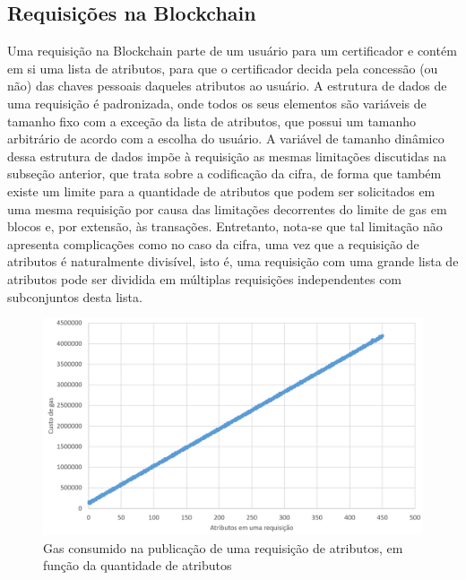 \documentclass[a4paper,11pt]{article}
\begin{document}
\subsection{Requisições na Blockchain}
\label{sec:sub:experimento-requisicoes}

Uma requisição na Blockchain parte de um usuário para um certificador e contém em si uma lista de atributos, para que o certificador decida pela concessão (ou não) das chaves pessoais daqueles atributos ao usuário.
A estrutura de dados de uma requisição é padronizada, onde todos os seus elementos são variáveis de tamanho fixo com a exceção da lista de atributos, que possui um tamanho arbitrário de acordo com a escolha do usuário.
A variável de tamanho dinâmico dessa estrutura de dados impõe à requisição as mesmas limitações discutidas na subseção anterior, que trata sobre a codificação da cifra, de forma que também existe um limite para a quantidade de atributos que podem ser solicitados em uma mesma requisição por causa das limitações decorrentes do limite de gas em blocos e, por extensão, às transações.
Entretanto, nota-se que tal limitação não apresenta complicações como no caso da cifra, uma vez que a requisição de atributos é naturalmente divisível, isto é, uma requisição com uma grande lista de atributos pode ser dividida em múltiplas requisições independentes com subconjuntos desta lista.

\begin{figure}[!h]
    \centering
    \includegraphics[width=\textwidth]{images/resultados-crescimento-custo-requisicao.png}
    \caption{Gas consumido na publicação de uma requisição de atributos, em função da quantidade de atributos}
    \label{fig:custo-transacao}
\end{figure}
\end{document}
